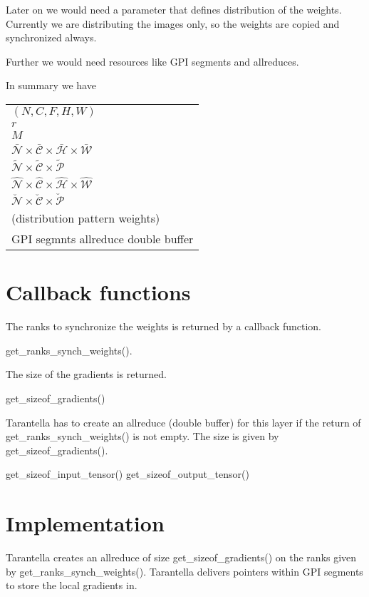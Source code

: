\documentclass{report}
\begin{document}
Later on we would need a parameter that defines distribution of the weights.
Currently we are distributing the images only, so the weights are copied and
synchronized always.


Further we would need resources like GPI segments and allreduces.

In summary we have

\begin{tabular}{l}
  $(N, C, F, H, W)$ \\
  $r$ \\
  $M$ \\
  $\bar{\mathcal{N}} \times \bar{\mathcal{C}} \times \bar{\mathcal{H}} \times
  \bar{\mathcal{W}}$\\
$\tilde{\mathcal{N}} \times \tilde{\mathcal{C}} \times \tilde{\mathcal{P}}$\\
  $\hat{\mathcal{N}} \times \hat{\mathcal{C}} \times \hat{\mathcal{H}} \times
  \hat{\mathcal{W}}$\\
  $\breve{\mathcal{N}} \times \breve{\mathcal{C}} \times \breve{\mathcal{P}}$\\
  (distribution pattern weights) \\
  GPI segmnts 
  allreduce double buffer
\end{tabular}

\section{Callback functions}

The ranks to synchronize the weights is returned by a callback function.

get\_ranks\_synch\_weights().

The size of the gradients is returned.

get\_sizeof\_gradients()

Tarantella has to create an allreduce (double buffer) for this layer if the
return of get\_ranks\_synch\_weights() is not empty. The size is
given by get\_sizeof\_gradients().

get\_sizeof\_input\_tensor()
get\_sizeof\_output\_tensor()

\section{Implementation}

Tarantella creates an allreduce of size get\_sizeof\_gradients() on the
ranks given by get\_ranks\_synch\_weights(). Tarantella delivers
pointers within GPI segments to store the local gradients in.
\end{document}
